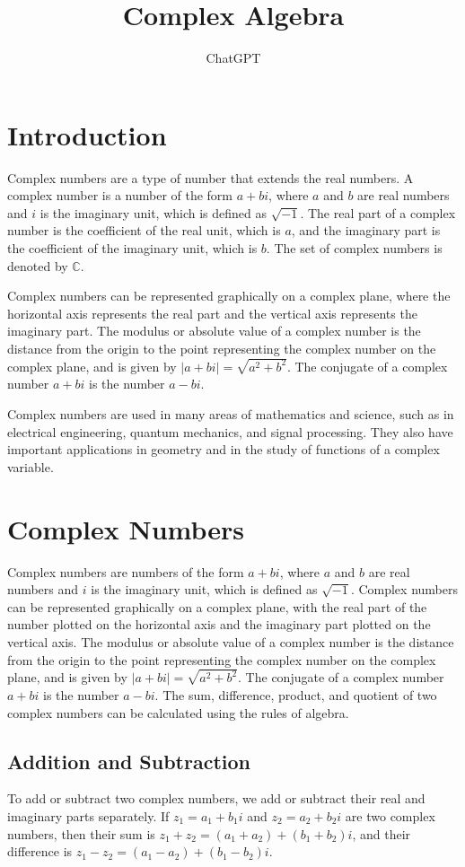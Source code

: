 \documentclass{article}
\title{Complex Algebra}
\author{ChatGPT}
\begin{document}
\maketitle
\tableofcontents
\section{Introduction}
Complex numbers are a type of number that extends the real numbers. A complex
number is a number of the form $a + bi$, where $a$ and $b$ are real numbers and
$i$ is the imaginary unit, which is defined as $\sqrt{-1}$. The real part of a
complex number is the coefficient of the real unit, which is $a$, and the
imaginary part is the coefficient of the imaginary unit, which is $b$. The set
of complex numbers is denoted by $\mathbb{C}$. 

Complex numbers can be represented graphically on a complex plane, where the
horizontal axis represents the real part and the vertical axis represents the
imaginary part. The modulus or absolute value of a complex number is the
distance from the origin to the point representing the complex number on the
complex plane, and is given by $|a + bi| = \sqrt{a^2 + b^2}$. The conjugate of
a complex number $a + bi$ is the number $a - bi$. 

Complex numbers are used in many areas of mathematics and science, such as in
electrical engineering, quantum mechanics, and signal processing. They also
have important applications in geometry and in the study of functions of a
complex variable.

\section{Complex Numbers}
Complex numbers are numbers of the form $a + bi$,
where $a$ and $b$ are real numbers and $i$ is the imaginary unit, which is
defined as $\sqrt{-1}$. Complex numbers can be represented graphically on a
complex plane, with the real part of the number plotted on the horizontal axis
and the imaginary part plotted on the vertical axis. The modulus or absolute
value of a complex number is the distance from the origin to the point
representing the complex number on the complex plane, and is given by $|a + bi|
= \sqrt{a^2 + b^2}$. The conjugate of a complex number $a + bi$ is the number
$a - bi$. The sum, difference, product, and quotient of two complex numbers can
be calculated using the rules of algebra.

\subsection{Addition and Subtraction}
  To add or subtract two complex numbers, we add or subtract their real and
  imaginary parts separately. If $z_1 = a_1 + b_1i$ and $z_2 = a_2 + b_2i$ are
  two complex numbers, then their sum is $z_1 + z_2 = (a_1 + a_2) + (b_1 +
  b_2)i$, and their difference is $z_1 - z_2 = (a_1 - a_2) + (b_1 - b_2)i$.
\end{document}
